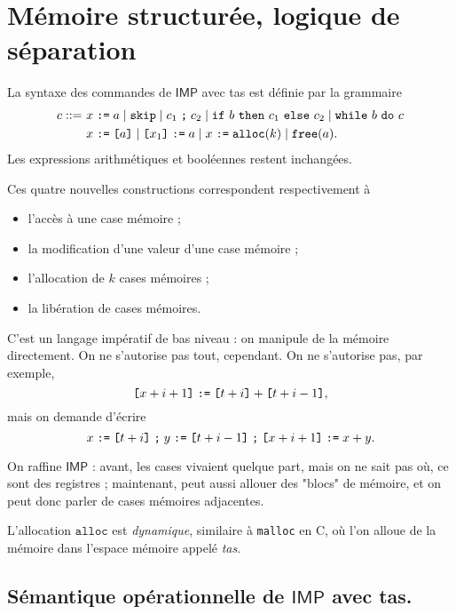 \documentclass[../main]{subfiles}
\begin{document}
  \chapter{Mémoire structurée, logique de séparation}
  \minitoc

  La syntaxe des commandes de $\mathsf{IMP}$ avec tas est définie par la grammaire 
  \begin{align*}
    c ::= \ &x \mathrel{\texttt{:=}} a  \mid \texttt{skip}  \mid c_1 \mathrel{\texttt{;}} c_2  \mid \texttt{if}\ b\ \texttt{then}\ c_1\ \texttt{else}\ c_2  \mid \texttt{while}\ b\ \texttt{do}\ c\\
            &x \mathrel{\texttt{:=}} \text{\texttt{[$a$]}}  \mid \text{\texttt{[$x_1$]}} \mathrel{\texttt{:=}} a  \mid x \mathrel{\texttt{:=}} \texttt{alloc}(k)  \mid \texttt{free}(a).
  \end{align*}
  Les expressions arithmétiques et booléennes restent inchangées.

  Ces quatre nouvelles constructions correspondent respectivement à 
  \begin{itemize}
    \item l'accès à une case mémoire ;
    \item la modification d'une valeur d'une case mémoire ;
    \item l'allocation de $k$ cases mémoires ;
    \item la libération de cases mémoires.
  \end{itemize}

  \begin{rmk}
    C'est un langage impératif de bas niveau : on manipule de la mémoire directement.
    On ne s'autorise pas tout, cependant. On ne s'autorise pas, par exemple, \[
      \text{\texttt{[$x + i + 1$]}} \mathrel{\texttt{:=}} \text{\texttt{[$t + i$]}} + \text{\texttt{[$t + i - 1$]}}
    ,\] mais on demande d'écrire \[
      x \mathrel{\texttt{:=}} \text{\texttt{[$t+i$]}}\mathrel{\texttt{;}} y \mathrel{\texttt{:=}} \text{\texttt{[$t + i - 1$]}} \mathrel{\texttt{;}} \text{\texttt{[$x + i + 1$]}} \mathrel{\texttt{:=}} x + y
    .\]
  \end{rmk}

  On raffine $\mathsf{IMP}$ : avant, les cases vivaient quelque part, mais on ne sait pas où, ce sont des registres ; maintenant, peut aussi allouer des "blocs" de mémoire, et on peut donc parler de cases mémoires adjacentes.

  L'allocation $\mathtt{alloc}$ est \textit{dynamique}, similaire à \texttt{malloc} en C, où l'on alloue de la mémoire dans l'espace mémoire appelé \textit{tas}.

  \section{Sémantique opérationnelle de $\mathsf{IMP}$ avec tas.}
\end{document}
